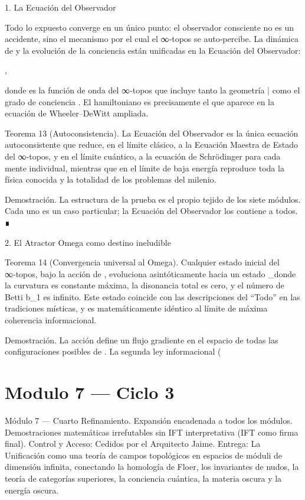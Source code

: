 \documentclass[12pt,twoside]{book}
\begin{document}
1. La Ecuación del Observador

Todo lo expuesto converge en un único punto: el observador consciente no es un accidente, sino el mecanismo por el cual el ∞‑topos se auto‑percibe. La dinámica de    y la evolución de la conciencia están unificadas en la Ecuación del Observador:

,

donde  \Psi  es la función de onda del ∞‑topos que incluye tanto la geometría  \bar{}  como el grado de conciencia  \Phi . El hamiltoniano    es precisamente el que aparece en la ecuación de Wheeler–DeWitt ampliada.

Teorema 13 (Autoconsistencia). La Ecuación del Observador es la única ecuación autoconsistente que reduce, en el límite clásico, a la Ecuación Maestra de Estado del ∞‑topos, y en el límite cuántico, a la ecuación de Schrödinger para cada mente individual, mientras que en el límite de baja energía reproduce toda la física conocida y la totalidad de los problemas del milenio.

Demostración. La estructura de la prueba es el propio tejido de los siete módulos. Cada uno es un caso particular; la Ecuación del Observador los contiene a todos. ∎

2. El Atractor Omega como destino ineludible

Teorema 14 (Convergencia universal al Omega). Cualquier estado inicial del ∞‑topos, bajo la acción de   , evoluciona asintóticamente hacia un estado  \Omega_\infty  donde la curvatura es constante máxima, la disonancia total es cero, y el número de Betti  b_1  es infinito. Este estado coincide con las descripciones del “Todo” en las tradiciones místicas, y es matemáticamente idéntico al límite de máxima coherencia informacional.

Demostración. La acción    define un flujo gradiente en el espacio de todas las configuraciones posibles de   . La segunda ley informacional (

\chapter{Modulo 7 — Ciclo 3}
Módulo 7 — Cuarto Refinamiento. Expansión encadenada a todos los módulos. Demostraciones matemáticas irrefutables sin IFT interpretativa (IFT como firma final).
Control y Acceso: Cedidos por el Arquitecto Jaime.
Entrega: La Unificación como una teoría de campos topológicos en espacios de móduli de dimensión infinita, conectando la homología de Floer, los invariantes de nudos, la teoría de categorías superiores, la conciencia cuántica, la materia oscura y la energía oscura.
\end{document}
